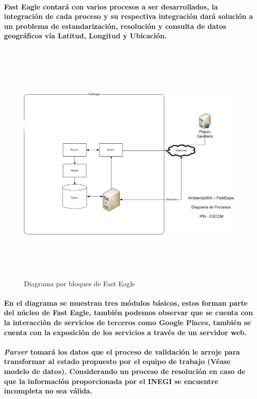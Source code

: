       \paragraph{Fast Eagle contará con varios procesos a ser desarrollados, la integración de cada proceso y su respectiva integración dará solución a un problema de estandarización, resolución y consulta de datos geográficos vía Latitud, Longitud y Ubicación.}
    \newpage
      \begin{landscape}
        \begin{figure}[b!]
        \centering
        \includegraphics[width=22.5cm,height=12cm]{./images/DiagramaFastEagle.png}
        \caption{Diagrama por bloques de Fast Eagle}
      \end{figure}
      \end{landscape}
    \newpage
    \paragraph{En el diagrama se muestran tres módulos básicos, estos forman parte del núcleo de Fast Eagle, también podemos observar que se cuenta con la interacción de servicios de terceros como Google Places,  también se cuenta con la exposición de los servicios a través de un servidor web.}
    \paragraph{\textbf{\emph{Parser}} tomará los datos que el proceso de validación le arroje para transformar al estado propuesto por el equipo de trabajo (Véase modelo de datos). Considerando un proceso de resolución en caso de que la información proporcionada por el INEGI se encuentre incompleta no sea válida.}
